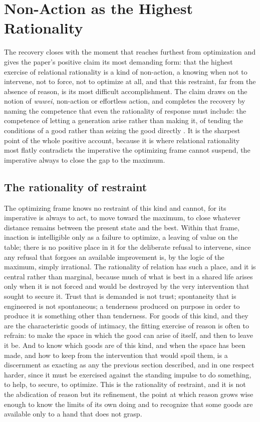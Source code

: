 \section{Non-Action as the Highest Rationality}
\label{p25:sec:wuwei}

\noindent
The recovery closes with the moment that reaches furthest from optimization and gives the paper's positive claim its most demanding form: that the highest exercise of relational rationality is a kind of non-action, a knowing when not to intervene, not to force, not to optimize at all, and that this restraint, far from the absence of reason, is its most difficult accomplishment. The claim draws on the notion of \emph{wuwei}, non-action or effortless action, and completes the recovery by naming the competence that even the rationality of response must include: the competence of letting a generation arise rather than making it, of tending the conditions of a good rather than seizing the good directly \parencite{laozi2003daodejing}. It is the sharpest point of the whole positive account, because it is where relational rationality most flatly contradicts the imperative the optimizing frame cannot suspend, the imperative always to close the gap to the maximum.

\subsection*{The rationality of restraint}

The optimizing frame knows no restraint of this kind and cannot, for its imperative is always to act, to move toward the maximum, to close whatever distance remains between the present state and the best. Within that frame, inaction is intelligible only as a failure to optimize, a leaving of value on the table; there is no positive place in it for the deliberate refusal to intervene, since any refusal that forgoes an available improvement is, by the logic of the maximum, simply irrational. The rationality of relation has such a place, and it is central rather than marginal, because much of what is best in a shared life arises only when it is not forced and would be destroyed by the very intervention that sought to secure it. Trust that is demanded is not trust; spontaneity that is engineered is not spontaneous; a tenderness produced on purpose in order to produce it is something other than tenderness. For goods of this kind, and they are the characteristic goods of intimacy, the fitting exercise of reason is often to refrain: to make the space in which the good can arise of itself, and then to leave it be. And to know which goods are of this kind, and when the space has been made, and how to keep from the intervention that would spoil them, is a discernment as exacting as any the previous section described, and in one respect harder, since it must be exercised against the standing impulse to do something, to help, to secure, to optimize. This is the rationality of restraint, and it is not the abdication of reason but its refinement, the point at which reason grows wise enough to know the limits of its own doing and to recognize that some goods are available only to a hand that does not grasp.

